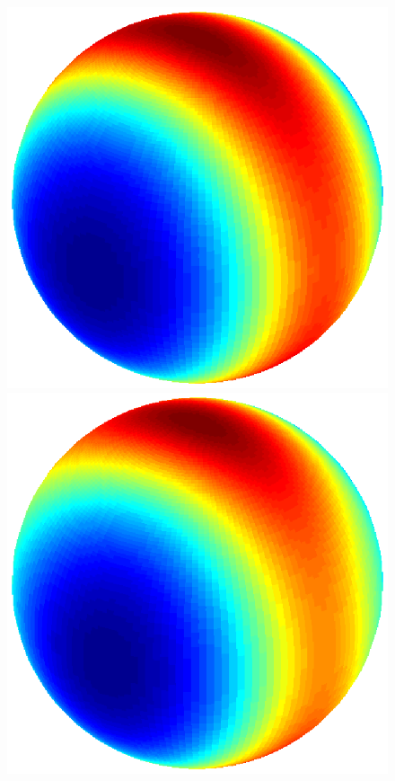 \documentclass[dvips,aoas,preprint]{imsart}
\numberwithin{equation}{section}
\theoremstyle{plain}
\begin{document}
\begin{figure}[!htbp]
\begin{minipage}[]{0.12\textwidth}
    \end{minipage}
    \begin{minipage}[]{0.12\textwidth}
      \centering
      \includegraphics*[width=\textwidth]{figure2f1.eps}
    \end{minipage}
    \begin{minipage}[]{0.12\textwidth}
      \centering
      \includegraphics*[width=\textwidth]{figure2g1.eps}

\end{minipage}
\end{figure}
\end{document}
